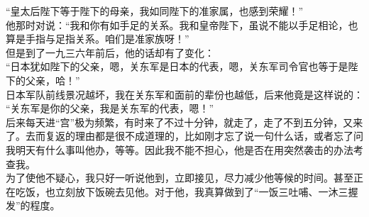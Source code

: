 “皇太后陛下等于陛下的母亲，我如同陛下的准家属，也感到荣耀！”\\

他那时对说：“我和你有如手足的关系。我和皇帝陛下，虽说不能以手足相论，也算是手指与足指关系。咱们是准家族呀！”\\

但是到了一九三六年前后，他的话却有了变化：\\

“日本犹如陛下的父亲，嗯，关东军是日本的代表，嗯，关东军司令官也等于是陛下的父亲，哈！”\\

日本军队前线景况越坏，我在关东军和面前的辈份也越低，后来他竟是这样说的：\\

“关东军是你的父亲，我是关东军的代表，嗯！”\\

后来每天进“宫”极为频繁，有时来了不过十分钟，就走了，走了不到五分钟，又来了。去而复返的理由都是很不成道理的，比如刚才忘了说一句什么话，或者忘了问我明天有什么事叫他办，等等。因此我不能不担心，他是否在用突然袭击的办法考查我。\\

为了使他不疑心，我只好一听说他到，立即接见，尽力减少他等候的时间。甚至正在吃饭，也立刻放下饭碗去见他。对于他，我真算做到了“一饭三吐哺、一沐三握发”的程度。
